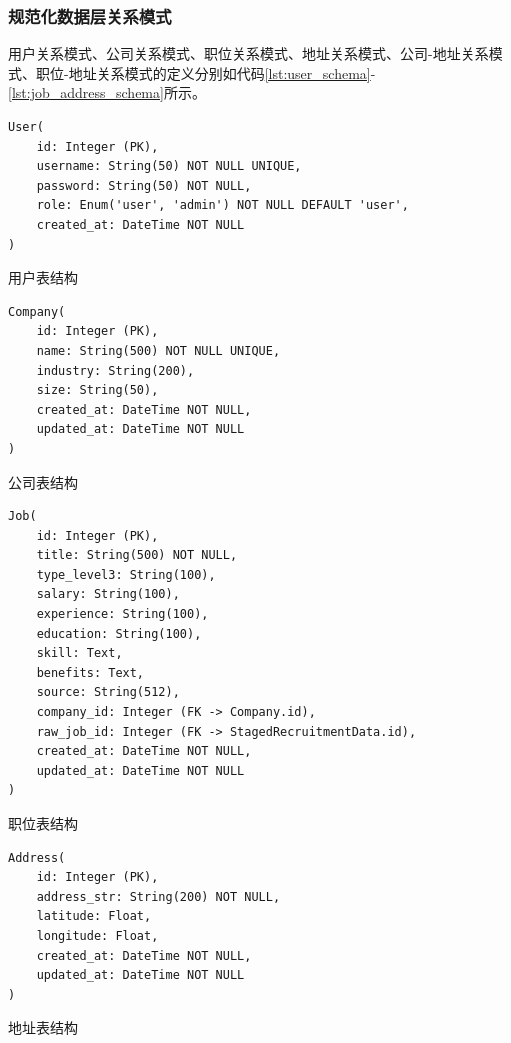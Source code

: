 \subsubsection{规范化数据层关系模式}

用户关系模式、公司关系模式、职位关系模式、地址关系模式、公司-地址关系模式、职位-地址关系模式的定义分别如代码\ref{lst:user_schema}-\ref{lst:job_address_schema}所示。


  \begin{listing}[htbp]
    \begin{verbatim}
User(
    id: Integer (PK),
    username: String(50) NOT NULL UNIQUE,
    password: String(50) NOT NULL,
    role: Enum('user', 'admin') NOT NULL DEFAULT 'user',
    created_at: DateTime NOT NULL
)
    \end{verbatim}
    \caption{用户表结构}\label{lst:user_schema}
  \end{listing}

  \begin{listing}[htbp]
    \begin{verbatim}
Company(
    id: Integer (PK),
    name: String(500) NOT NULL UNIQUE,
    industry: String(200),
    size: String(50),
    created_at: DateTime NOT NULL,
    updated_at: DateTime NOT NULL
)
    \end{verbatim}
    \caption{公司表结构}\label{lst:company_schema}
  \end{listing}

  \begin{listing}[htbp]
    \begin{verbatim}
Job(
    id: Integer (PK),
    title: String(500) NOT NULL,
    type_level3: String(100),
    salary: String(100),
    experience: String(100),
    education: String(100),
    skill: Text,
    benefits: Text,
    source: String(512),
    company_id: Integer (FK -> Company.id),
    raw_job_id: Integer (FK -> StagedRecruitmentData.id),
    created_at: DateTime NOT NULL,
    updated_at: DateTime NOT NULL
)
    \end{verbatim}
    \caption{职位表结构}\label{lst:job_schema}
  \end{listing}

  \begin{listing}[htbp]
    \begin{verbatim}
Address(
    id: Integer (PK),
    address_str: String(200) NOT NULL,
    latitude: Float,
    longitude: Float,
    created_at: DateTime NOT NULL,
    updated_at: DateTime NOT NULL
)
    \end{verbatim}
    \caption{地址表结构}\label{lst:address_schema}
  \end{listing}

